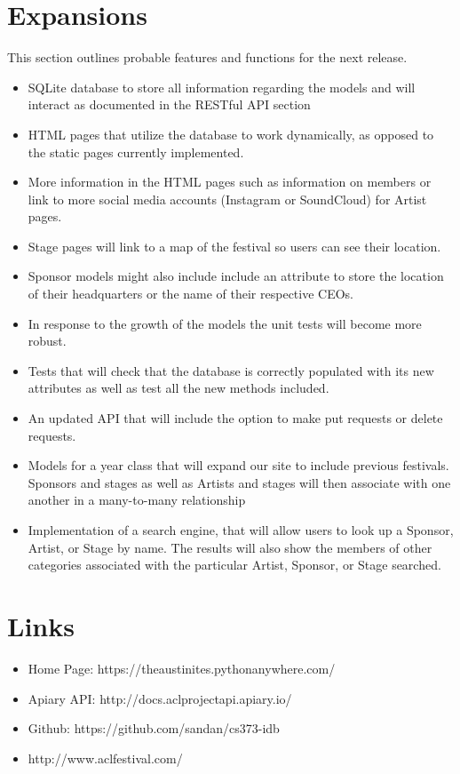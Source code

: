 \documentclass[12pt,english]{scrartcl}
\begin{document}
\section{Expansions}
This section outlines probable features and functions for the next release.
\begin{itemize}
\item SQLite database to store all information regarding the models and will interact as documented in the RESTful API section

\item HTML pages that utilize the database to work dynamically, as opposed to the static pages currently implemented.

\item More information in the HTML pages such as information on members or link to more social media accounts (Instagram or SoundCloud) for Artist pages.

\item Stage pages will link to a map of the festival so users can see their location.

\item Sponsor models might also include include an attribute to store the location of their headquarters or the name of their respective CEOs.

\item In response to the growth of the models the unit tests will become more robust.

\item  Tests that will check that the database is correctly populated with its new attributes as well as test all the new methods included.

\item An updated API that will include the option to make put requests or delete requests.

\item Models for a year class that will expand our site to include previous festivals. Sponsors and stages as well as Artists and stages will then 
associate with one another in a many-to-many relationship

\item Implementation of a search engine, that will allow users to look up a Sponsor, Artist, or Stage by name. The results will also show the members 
of other categories associated with the particular Artist, Sponsor, or Stage searched.

\end{itemize}

\section{Links}
\begin{itemize}
 \item Home Page: https://theaustinites.pythonanywhere.com/
 \item Apiary API: http://docs.aclprojectapi.apiary.io/
 \item Github: https://github.com/sandan/cs373-idb
 \item http://www.aclfestival.com/
\end{itemize}
\end{document}
